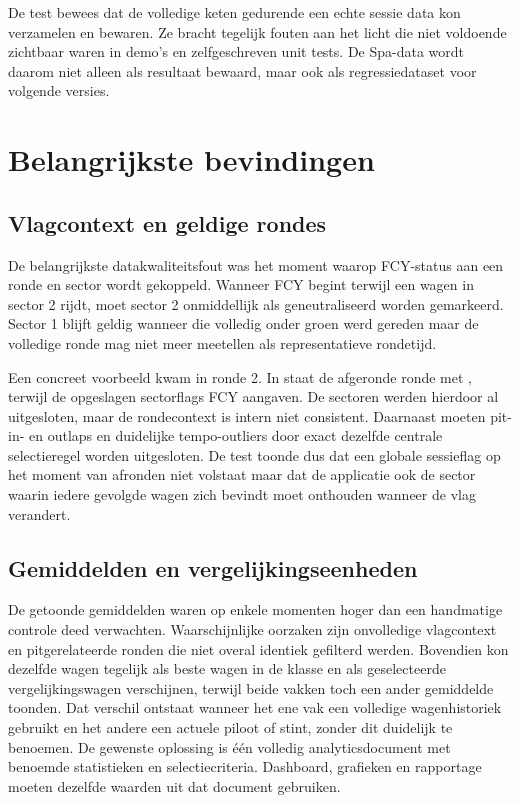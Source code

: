 De test bewees dat de volledige keten gedurende een echte sessie data kon verzamelen en bewaren. Ze
bracht tegelijk fouten aan het licht die niet voldoende zichtbaar waren in demo's en zelfgeschreven unit tests. De Spa-data wordt daarom niet alleen als resultaat bewaard, maar ook als regressiedataset voor volgende versies.

\section{Belangrijkste bevindingen}
\subsection{Vlagcontext en geldige rondes}
De belangrijkste datakwaliteitsfout was het moment waarop FCY-status aan een ronde
en sector wordt gekoppeld. Wanneer FCY begint terwijl een wagen in sector 2 rijdt, moet sector 2
onmiddellijk als geneutraliseerd worden gemarkeerd. Sector 1 blijft geldig wanneer die volledig
onder groen werd gereden maar de volledige ronde mag niet meer meetellen als representatieve rondetijd.

Een concreet voorbeeld kwam in ronde 2. In  staat de afgeronde ronde
met , terwijl de opgeslagen sectorflags FCY aangaven. De sectoren werden
hierdoor al uitgesloten, maar de rondecontext is intern niet consistent. Daarnaast moeten pit-in- en
outlaps en duidelijke tempo-outliers door exact dezelfde centrale selectieregel worden uitgesloten.
De test toonde dus dat een globale sessieflag op het moment van afronden niet volstaat maar dat de applicatie
ook de sector waarin iedere gevolgde wagen zich bevindt moet onthouden wanneer de vlag verandert.

\subsection{Gemiddelden en vergelijkingseenheden}
De getoonde gemiddelden waren op enkele momenten hoger dan een handmatige controle deed verwachten.
Waarschijnlijke oorzaken zijn onvolledige vlagcontext en pitgerelateerde ronden die niet overal
identiek gefilterd werden. Bovendien kon dezelfde wagen tegelijk als beste wagen in de klasse en als
geselecteerde vergelijkingswagen verschijnen, terwijl beide vakken toch een ander gemiddelde
toonden. Dat verschil ontstaat wanneer het ene vak een volledige wagenhistoriek gebruikt en het
andere een actuele piloot of stint, zonder dit duidelijk te benoemen.
De gewenste oplossing is één volledig analyticsdocument met benoemde statistieken en
selectiecriteria. Dashboard, grafieken en rapportage moeten dezelfde waarden uit dat document
gebruiken.

